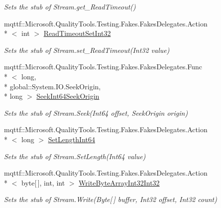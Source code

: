 \begin{DoxyCompactItemize}
\begin{DoxyCompactList}\small\item\em Sets the stub of Stream.\-get\-\_\-\-Read\-Timeout()\end{DoxyCompactList}\item 
mqttf\-::\-Microsoft.\-Quality\-Tools.\-Testing.\-Fakes.\-Fakes\-Delegates.\-Action\\*
$<$ int $>$ \hyperlink{class_system_1_1_i_o_1_1_fakes_1_1_stub_stream_a66eda3159ace4dfaf6fdc4fdd12fbca7}{Read\-Timeout\-Set\-Int32}
\begin{DoxyCompactList}\small\item\em Sets the stub of Stream.\-set\-\_\-\-Read\-Timeout(\-Int32 value)\end{DoxyCompactList}\item 
mqttf\-::\-Microsoft.\-Quality\-Tools.\-Testing.\-Fakes.\-Fakes\-Delegates.\-Func\\*
$<$ long, \\*
global\-::\-System.\-I\-O.\-Seek\-Origin, \\*
long $>$ \hyperlink{class_system_1_1_i_o_1_1_fakes_1_1_stub_stream_adb37ef5875d4d463feaa872bf12d879f}{Seek\-Int64\-Seek\-Origin}
\begin{DoxyCompactList}\small\item\em Sets the stub of Stream.\-Seek(\-Int64 offset, Seek\-Origin origin)\end{DoxyCompactList}\item 
mqttf\-::\-Microsoft.\-Quality\-Tools.\-Testing.\-Fakes.\-Fakes\-Delegates.\-Action\\*
$<$ long $>$ \hyperlink{class_system_1_1_i_o_1_1_fakes_1_1_stub_stream_a684017b9b494ad7467072ca54a9d566e}{Set\-Length\-Int64}
\begin{DoxyCompactList}\small\item\em Sets the stub of Stream.\-Set\-Length(\-Int64 value)\end{DoxyCompactList}\item 
mqttf\-::\-Microsoft.\-Quality\-Tools.\-Testing.\-Fakes.\-Fakes\-Delegates.\-Action\\*
$<$ byte\mbox{[}$\,$\mbox{]}, int, int $>$ \hyperlink{class_system_1_1_i_o_1_1_fakes_1_1_stub_stream_acb66daf4e96df78ed0bc5c280daa90f1}{Write\-Byte\-Array\-Int32\-Int32}
\begin{DoxyCompactList}\small\item\em Sets the stub of Stream.\-Write(\-Byte\mbox{[}$\,$\mbox{]} buffer, Int32 offset, Int32 count)\end{DoxyCompactList}\item 

\end{DoxyCompactItemize}
